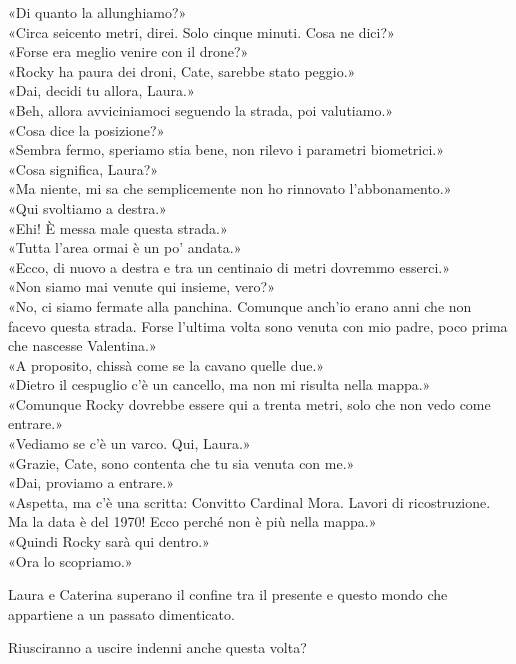 \par\medskip
«Di quanto la allunghiamo?»\\
«Circa seicento metri, direi. Solo cinque minuti. Cosa ne dici?»\\
«Forse era meglio venire con il drone?»\\
«Rocky ha paura dei droni, Cate, sarebbe stato peggio.»\\
«Dai, decidi tu allora, Laura.»\\
«Beh, allora avviciniamoci seguendo la strada, poi valutiamo.»\\
«Cosa dice la posizione?»\\
«Sembra fermo, speriamo stia bene, non rilevo i parametri biometrici.»\\
«Cosa significa, Laura?»\\
«Ma niente, mi sa che semplicemente non ho rinnovato l’abbonamento.»\\
«Qui svoltiamo a destra.»\\
«Ehi! È messa male questa strada.»\\
«Tutta l’area ormai è un po’ andata.»\\
«Ecco, di nuovo a destra e tra un centinaio di metri dovremmo esserci.»\\
«Non siamo mai venute qui insieme, vero?»\\
«No, ci siamo fermate alla panchina. Comunque anch’io erano anni che non facevo questa strada.  
Forse l’ultima volta sono venuta con mio padre, poco prima che nascesse Valentina.»\\
«A proposito, chissà come se la cavano quelle due.»\\
«Dietro il cespuglio c’è un cancello, ma non mi risulta nella mappa.»\\
«Comunque Rocky dovrebbe essere qui a trenta metri, solo che non vedo come entrare.»\\
«Vediamo se c’è un varco. Qui, Laura.»\\
«Grazie, Cate, sono contenta che tu sia venuta con me.»\\
«Dai, proviamo a entrare.»\\
«Aspetta, ma c’è una scritta: Convitto Cardinal Mora.  
Lavori di ricostruzione. Ma la data è del 1970! Ecco perché non è più nella mappa.»\\
«Quindi Rocky sarà qui dentro.»\\
«Ora lo scopriamo.»

\par\medskip
Laura e Caterina superano il confine tra il presente e questo mondo che appartiene a un passato dimenticato.

\par\medskip
Riusciranno a uscire indenni anche questa volta?
